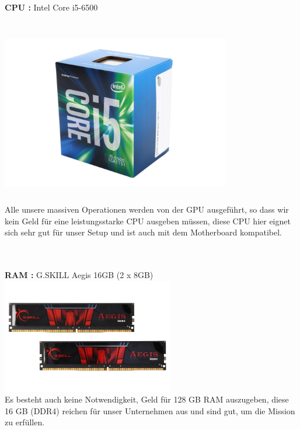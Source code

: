 \documentclass[ngerman]{scrreprt}
\begin{document}
\begin{large}
	\textbf{CPU :} Intel Core i5-6500 \\ \\
	\includegraphics[width=10cm,height=8cm]{cpu}  \\ 
	Alle unsere massiven Operationen werden von der GPU ausgeführt, so dass wir kein Geld für eine leistungsstarke CPU ausgeben müssen, diese CPU hier eignet sich sehr gut für unser Setup und ist auch mit dem Motherboard kompatibel. \\ \\ \\
	
\end{large}
\begin{large}
	\textbf{RAM :} G.SKILL Aegis 16GB (2 x 8GB) \\ 
	\includegraphics[width=\linewidth,height=5cm]{ram}  \\
	Es besteht auch keine Notwendigkeit, Geld für 128 GB RAM auszugeben, diese 16 GB (DDR4) reichen für unser Unternehmen aus und sind gut, um die Mission zu erfüllen. \\
	
	
	
\end{large}
\newpage
\end{document}
